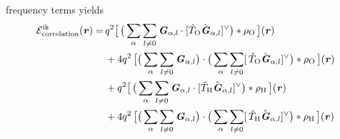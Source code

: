 \documentclass[journal=jacsat,manuscript=article]{achemso}
\renewcommand{\v}[1]{\textbf{\textit{#1}}}
\renewcommand{\d}[1]{\textsf{#1}}
\begin{document}
frequency terms yields
\begin{align}\nonumber
  \mathcal E^{\textrm{ik}}_{\textrm{correlation}}(\v r)
  =\,&
  q^2
  \big[\,
  \big(
  \sum_{\alpha} \sum_{l\neq 0}
  \v G_{\alpha,l}\cdot[\hat T_{\textrm{O}}\hat{\v G}_{\alpha,l}]^{\vee}
  \big)
  \ast \rho_{\textrm{O}}
  \,\big] (\v r) \\\nonumber
  \,&+
  4q^2\,
  \big[
  \big(
  \sum_{\alpha} \sum_{l\neq 0}  
  \v G_{\alpha,l}
  \big)
  \cdot
  \big(
  \sum_{\alpha} \sum_{l\neq 0}  
  [\,\hat T_{\textrm{O}}\hat{\v G}_{\alpha,l}]^{\vee}
  \big)
  \ast \rho_{\textrm{O}}\,
  \big] (\v r) \\\nonumber
  \,&+
  q^2
  \big[\,
  \big(
  \sum_{\alpha} \sum_{l\neq 0}
  \v G_{\alpha,l}\cdot[\hat T_{\textrm{H}}\hat{\v G}_{\alpha,l}]^{\vee}
  \big)
  \ast \rho_{\textrm{H}}
  \,\big] (\v r) \\
  \,&+
  4q^2\,
  \big[
  \big(
  \sum_{\alpha} \sum_{l\neq 0}  
  \v G_{\alpha,l}
  \big)
  \cdot
  \big(
  \sum_{\alpha} \sum_{l\neq 0}  
  [\,\hat T_{\textrm{H}}\hat{\v G}_{\alpha,l}]^{\vee}
  \big)
  \ast \rho_{\textrm{H}}\,
  \big] (\v r) 
\end{align}
\end{document}
